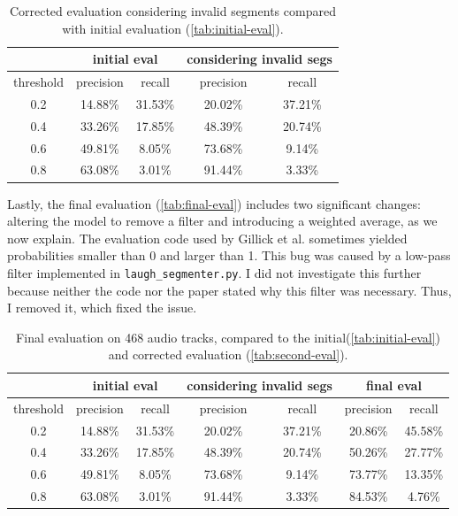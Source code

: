 \documentclass[bsc,frontabs,parskip,deptreport]{infthesis}
\begin{document}
\begin{table}[h!]
    \centering
    \begin{tabular}{|c|c|c|c|c|}
    \hline
    & \multicolumn{2}{|c|}{initial eval} & \multicolumn{2}{|c|}{considering invalid segs} \\
    \hline 
    threshold & precision & recall & precision & recall \\
    \hline
        0.2 &  14.88\% & 31.53\% & 20.02\% & 37.21\%\\ 
        0.4 &  33.26\% & 17.85\% & 48.39\% & 20.74\%\\ 
        0.6 &  49.81\% & 8.05\% & 73.68\% & 9.14\%  \\ 
        0.8 &  63.08\% & 3.01\% & 91.44\% & 3.33\%  \\ 
     \hline
    \end{tabular}
    \caption{Corrected evaluation considering invalid segments compared with initial evaluation (\autoref{tab:initial-eval}).}
    \label{tab:second-eval}
\end{table}

Lastly, the final evaluation (\autoref{tab:final-eval}) includes two significant changes: altering the model to remove a filter and introducing a weighted average, as we now explain. 
The evaluation code used by Gillick et al. sometimes yielded probabilities smaller than 0 and larger than 1. 
This bug was caused by a low-pass filter implemented in \verb|laugh_segmenter.py|. I did not investigate this further because neither the code nor the paper stated why this filter was necessary. Thus, I removed it, which fixed the issue.

\begin{table}[h!]
    \centering
    \begin{tabular}{|c|c|c|c|c|c|c|}
    \hline
    & \multicolumn{2}{|c|}{initial eval} & \multicolumn{2}{|c|}{considering invalid segs} & \multicolumn{2}{|c|}{final eval}  \\
    \hline 
    threshold & precision & recall & precision & recall & precision & recall  \\
    \hline
        0.2 &  14.88\% & 31.53\% & 20.02\% & 37.21\%  & 20.86\% & 45.58\%\\
        0.4 &  33.26\% & 17.85\% & 48.39\% & 20.74\%  & 50.26\% & 27.77\%\\
        0.6 &  49.81\% & 8.05\% & 73.68\% & 9.14\%    & 73.77\% & 13.35\% \\
        0.8 &  63.08\% & 3.01\% & 91.44\% & 3.33\%    & 84.53\% & 4.76\% \\
     \hline
    \end{tabular}
    \caption{Final evaluation on 468 audio tracks, compared to the initial(\autoref{tab:initial-eval}) and corrected evaluation (\autoref{tab:second-eval}).}
    \label{tab:final-eval}
\end{table}
\end{document}

